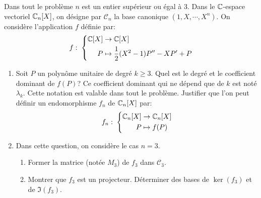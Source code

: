 Dans tout le problème $n$ est un entier supérieur ou égal à 3. Dans le $\mathbb{C}$-espace vectoriel $\mathbb{C}_n[X]$, on désigne par $\mathcal{C}_n$ la base canonique $(1,X,\cdots,X^n)$. On considère l'application $f$ définie par:
\begin{displaymath}
  f:\;
\left\lbrace 
\begin{aligned}
  \mathbb{C}[X] &\rightarrow \mathbb{C}[X] \\
  P &\mapsto \frac{1}{2}(X^2-1)P'' -X P' +P
\end{aligned}
\right. 
\end{displaymath}
\begin{enumerate}
  \item Soit $P$ un polynôme unitaire de degré $k\geq 3$. Quel est le degré et le coefficient dominant de $f(P)$?\newline
  Ce coefficient dominant qui ne dépend que de $k$ est noté $\lambda_k$. Cette notation est valable dans tout le problème.\newline
  Justifier que l'on peut définir un endomorphisme $f_n$ de $\mathbb{C}_n[X]$ par:
\begin{displaymath}
  f_n:\;
\left\lbrace 
\begin{aligned}
  \mathbb{C}_n[X] &\rightarrow \mathbb{C}_n[X] \\
  P &\mapsto f(P)
\end{aligned}
\right. 
\end{displaymath}

\item Dans cette question, on considère le cas $n=3$.
\begin{enumerate}
  \item Former la matrice (notée $M_3$) de $f_3$ dans $\mathcal{C}_3$.
  \item Montrer que $f_3$ est un projecteur. Déterminer des bases de $\ker(f_3)$ et de $\Im(f_3)$.
\end{enumerate}


\end{enumerate}
